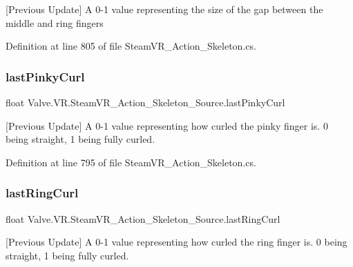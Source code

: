\mbox{[}Previous Update\mbox{]} A 0-\/1 value representing the size of the gap between the middle and ring fingers 



Definition at line 805 of file Steam\+V\+R\+\_\+\+Action\+\_\+\+Skeleton.\+cs.

\mbox{\label{class_valve_1_1_v_r_1_1_steam_v_r___action___skeleton___source_af4ae4f533115235085c78796c44115ad}} 
\subsubsection{\texorpdfstring{lastPinkyCurl}{lastPinkyCurl}}
{\footnotesize\ttfamily float Valve.\+V\+R.\+Steam\+V\+R\+\_\+\+Action\+\_\+\+Skeleton\+\_\+\+Source.\+last\+Pinky\+Curl\hspace{0.3cm}{\ttfamily [get]}}



\mbox{[}Previous Update\mbox{]} A 0-\/1 value representing how curled the pinky finger is. 0 being straight, 1 being fully curled. 



Definition at line 795 of file Steam\+V\+R\+\_\+\+Action\+\_\+\+Skeleton.\+cs.

\mbox{\label{class_valve_1_1_v_r_1_1_steam_v_r___action___skeleton___source_a5f878d6e852719151688c69fb8c126d5}} 
\subsubsection{\texorpdfstring{lastRingCurl}{lastRingCurl}}
{\footnotesize\ttfamily float Valve.\+V\+R.\+Steam\+V\+R\+\_\+\+Action\+\_\+\+Skeleton\+\_\+\+Source.\+last\+Ring\+Curl\hspace{0.3cm}{\ttfamily [get]}}



\mbox{[}Previous Update\mbox{]} A 0-\/1 value representing how curled the ring finger is. 0 being straight, 1 being fully curled. 



